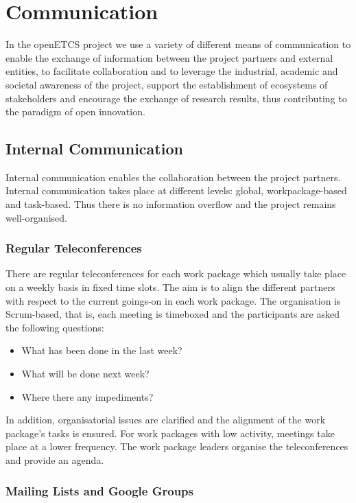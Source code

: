 ﻿\section{Communication}\label{sct:communication}
In the openETCS project we use a variety of different means of communication to enable the exchange of information between the project partners and external entities, to facilitate collaboration and to leverage the industrial, academic and societal awareness of the project, support the establishment of ecosystems of stakeholders and encourage the exchange of research results, thus contributing to the paradigm of open innovation.

\subsection{Internal Communication}

Internal communication enables the collaboration between the project partners. Internal communication takes place at different levels: global, workpackage-based and task-based. Thus there is no information overflow and the project remains well-organised.

\subsubsection{Regular Teleconferences}

There are regular teleconferences for each work package which usually take place on a weekly basis in fixed time slots. The aim is to align the different partners with respect to the current goings-on in each work package. The organisation is Scrum-based, that is, each meeting is timeboxed and the participants are asked the following questions:
\begin{itemize}
\item What has been done in the last week?
\item What will be done next week?
\item Where there any impediments?
\end{itemize}

In addition, organisatorial issues are clarified and the alignment of the work package's tasks is ensured. For work packages with low activity, meetings take place at a lower frequency. The work package leaders organise the teleconferences and provide an agenda.

\subsubsection{Mailing Lists and Google Groups}


